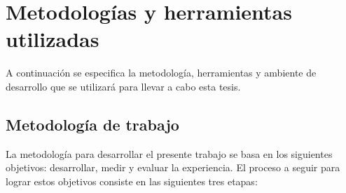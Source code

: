 \section{Metodologías y herramientas utilizadas}
A continuación se especifica la metodología, herramientas y ambiente de desarrollo que se utilizará para llevar a cabo esta tesis.

\subsection{Metodología de trabajo}

La metodología para desarrollar el presente trabajo se basa en los siguientes objetivos: desarrollar, medir y evaluar la experiencia. El proceso a seguir para lograr estos objetivos consiste en las siguientes tres etapas:

